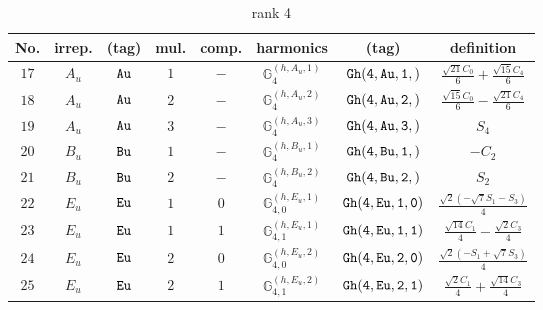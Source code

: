 \documentclass[fleqn,8pt]{jsarticle}
\begin{document}
\begin{table}[ht!]
\begin{center}
\caption{rank 4}
\renewcommand{\arraystretch}{1.3}
\begin{tabular}{cccccccc} \hline \hline
No. & irrep. & (tag) & mul. & comp. & harmonics & (tag) & definition \\ \hline
$ 17 $ & $ A_{u} $ & $ {\tt Au} $ & $ 1 $ & $ - $ & $ \mathbb{G}_{4}^{(h,A_{u},1)} $ & $ {\tt Gh(4,Au,1,)} $ & $ \frac{\sqrt{21} C_{0}}{6} + \frac{\sqrt{15} C_{4}}{6} $ \\
$ 18 $ & $ A_{u} $ & $ {\tt Au} $ & $ 2 $ & $ - $ & $ \mathbb{G}_{4}^{(h,A_{u},2)} $ & $ {\tt Gh(4,Au,2,)} $ & $ \frac{\sqrt{15} C_{0}}{6} - \frac{\sqrt{21} C_{4}}{6} $ \\
$ 19 $ & $ A_{u} $ & $ {\tt Au} $ & $ 3 $ & $ - $ & $ \mathbb{G}_{4}^{(h,A_{u},3)} $ & $ {\tt Gh(4,Au,3,)} $ & $ S_{4} $ \\
$ 20 $ & $ B_{u} $ & $ {\tt Bu} $ & $ 1 $ & $ - $ & $ \mathbb{G}_{4}^{(h,B_{u},1)} $ & $ {\tt Gh(4,Bu,1,)} $ & $ - C_{2} $ \\
$ 21 $ & $ B_{u} $ & $ {\tt Bu} $ & $ 2 $ & $ - $ & $ \mathbb{G}_{4}^{(h,B_{u},2)} $ & $ {\tt Gh(4,Bu,2,)} $ & $ S_{2} $ \\
$ 22 $ & $ E_{u} $ & $ {\tt Eu} $ & $ 1 $ & $ 0 $ & $ \mathbb{G}_{4,0}^{(h,E_{u},1)} $ & $ {\tt Gh(4,Eu,1,0)} $ & $ \frac{\sqrt{2} \left(- \sqrt{7} S_{1} - S_{3}\right)}{4} $ \\
$ 23 $ & $ E_{u} $ & $ {\tt Eu} $ & $ 1 $ & $ 1 $ & $ \mathbb{G}_{4,1}^{(h,E_{u},1)} $ & $ {\tt Gh(4,Eu,1,1)} $ & $ \frac{\sqrt{14} C_{1}}{4} - \frac{\sqrt{2} C_{3}}{4} $ \\
$ 24 $ & $ E_{u} $ & $ {\tt Eu} $ & $ 2 $ & $ 0 $ & $ \mathbb{G}_{4,0}^{(h,E_{u},2)} $ & $ {\tt Gh(4,Eu,2,0)} $ & $ \frac{\sqrt{2} \left(- S_{1} + \sqrt{7} S_{3}\right)}{4} $ \\
$ 25 $ & $ E_{u} $ & $ {\tt Eu} $ & $ 2 $ & $ 1 $ & $ \mathbb{G}_{4,1}^{(h,E_{u},2)} $ & $ {\tt Gh(4,Eu,2,1)} $ & $ \frac{\sqrt{2} C_{1}}{4} + \frac{\sqrt{14} C_{3}}{4} $ \\
 \hline \hline
\end{tabular}
\end{center}
\end{table}
\end{document}
